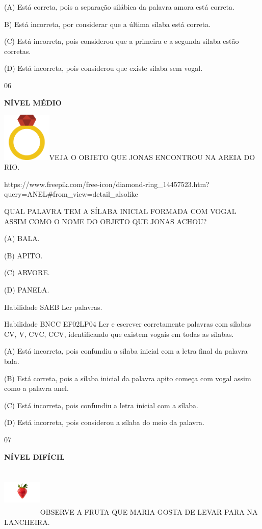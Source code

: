{{(A) Está correta, pois a separação silábica da palavra amora está
correta.

B) Está incorreta, por considerar que a última sílaba está correta.

(C) Está incorreta, pois considerou que a primeira e a segunda sílaba
estão corretas.

(D) Está incorreta, pois considerou que existe sílaba sem vogal.

\num{06}

\textbf{NÍVEL MÉDIO}

\includegraphics[width=0.92222in,height=0.92222in]{media/image151.png}VEJA
O OBJETO QUE JONAS ENCONTROU NA AREIA DO RIO.

https://www.freepik.com/free-icon/diamond-ring\_14457523.htm?query=ANEL\#from\_view=detail\_alsolike

QUAL PALAVRA TEM A SÍLABA INICIAL FORMADA COM VOGAL ASSIM COMO O NOME DO
OBJETO QUE JONAS ACHOU?

(A) BALA.

(B) APITO.

(C) ARVORE.

(D) PANELA.

Habilidade SAEB Ler palavras.

Habilidade BNCC EF02LP04 Ler e escrever corretamente palavras com
sílabas CV, V, CVC, CCV, identificando que existem vogais em todas as
sílabas.

(A) Está incorreta, pois confundiu a sílaba inicial com a letra final da
palavra bala.

(B) Está correta, pois a sílaba inicial da palavra apito começa com
vogal assim como a palavra anel.

(C) Está incorreta, pois confundiu a letra inicial com a sílaba.

(D) Está incorreta, pois considerou a sílaba do meio da palavra.

\num{07}

\textbf{NÍVEL DIFÍCIL}

\includegraphics[width=0.73819in,height=0.93750in]{media/image152.jpeg}OBSERVE
A FRUTA QUE MARIA GOSTA DE LEVAR PARA NA LANCHEIRA.

}}
